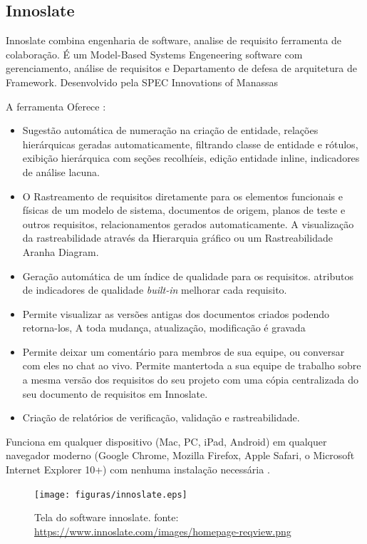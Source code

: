 \subsection{Innoslate}

Innoslate combina engenharia de software, analise de requisito ferramenta de colaboração. É um Model-Based Systems Engeneering software com gerenciamento, análise de requisitos e Departamento de defesa de arquitetura de Framework. Desenvolvido pela SPEC Innovations of Manassas

A ferramenta Oferece \cite{innoslate}:
\begin{itemize}
    \item Sugestão automática de numeração na criação de entidade, relações hierárquicas geradas automaticamente, filtrando classe de entidade e rótulos, exibição hierárquica com seções recolhíeis, edição entidade inline, indicadores de análise lacuna.
    \item O Rastreamento de requisitos diretamente para os elementos funcionais e físicas de um modelo de sistema, documentos de origem, planos de teste e outros requisitos, relacionamentos gerados automaticamente. A visualização da rastreabilidade através da Hierarquia gráfico ou um Rastreabilidade Aranha Diagram.
    \item Geração automática de um índice de qualidade para os requisitos. atributos de indicadores de qualidade \textit{built-in} melhorar cada requisito.
    \item Permite visualizar as versões antigas dos documentos criados podendo retorna-los, A toda mudança, atualização, modificação é gravada
    \item Permite deixar um comentário para membros de sua equipe, ou conversar com eles no chat ao vivo. Permite mantertoda a sua equipe de trabalho sobre a mesma versão dos requisitos do seu projeto com uma cópia centralizada do seu documento de requisitos em Innoslate.
    \item Criação de relatórios de verificação, validação e rastreabilidade.
\end{itemize}

Funciona em qualquer dispositivo (Mac, PC, iPad, Android) em qualquer navegador moderno (Google Chrome, Mozilla Firefox, Apple Safari, o Microsoft Internet Explorer 10+) com nenhuma instalação necessária \cite{innoslate}.
\begin{figure}[H]
    \centering
    \caption[Tela do software innoslate]{Tela do software innoslate. fonte: \url{https://www.innoslate.com/images/homepage-reqview.png}}
    \label{innoslateFerramenta}
    \texttt{[image: figuras/innoslate.eps]}
\end{figure}

